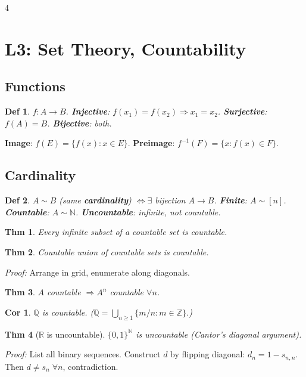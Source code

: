 \documentclass[9pt,landscape]{extarticle}
\newcommand{\R}{\mathbb{R}}
\newcommand{\N}{\mathbb{N}}
\newcommand{\Z}{\mathbb{Z}}
\newcommand{\Q}{\mathbb{Q}}
\theoremstyle{compact}
\newtheorem*{thm}{Thm}
\newtheorem*{defn}{Def}
\newtheorem*{cor}{Cor}
\begin{document}
\begin{multicols}{4}
\section{L3: Set Theory, Countability}

\subsection{Functions}
\begin{defn}
$f: A \to B$.
\textbf{Injective}: $f(x_1) = f(x_2) \Rightarrow x_1 = x_2$.
\textbf{Surjective}: $f(A) = B$.
\textbf{Bijective}: both.
\end{defn}

\textbf{Image}: $f(E) = \{f(x) : x \in E\}$. \textbf{Preimage}: $f^{-1}(F) = \{x : f(x) \in F\}$.

\subsection{Cardinality}
\begin{defn}
$A \sim B$ (same \textbf{cardinality}) $\Leftrightarrow \exists$ bijection $A \to B$.
\textbf{Finite}: $A \sim [n]$. \textbf{Countable}: $A \sim \N$. \textbf{Uncountable}: infinite, not countable.
\end{defn}

\begin{thm}
Every infinite subset of a countable set is countable.
\end{thm}

\begin{thm}
Countable union of countable sets is countable.
\end{thm}
\textit{Proof:} Arrange in grid, enumerate along diagonals.

\begin{thm}
$A$ countable $\Rightarrow A^n$ countable $\forall n$.
\end{thm}

\begin{cor}
$\Q$ is countable. ($\Q = \bigcup_{n \geq 1} \{m/n : m \in \Z\}$.)
\end{cor}

\begin{thm}[$\R$ is uncountable]
$\{0,1\}^\N$ is uncountable (Cantor's diagonal argument).
\end{thm}
\textit{Proof:} List all binary sequences. Construct $d$ by flipping diagonal: $d_n = 1 - s_{n,n}$. Then $d \neq s_n\;\forall n$, contradiction.


\end{multicols}
\end{document}
